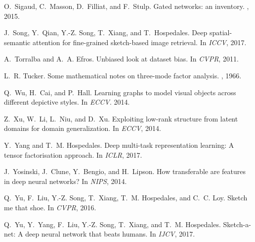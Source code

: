 \documentclass[10pt,twocolumn,letterpaper]{article}
\begin{document}
{\begin{thebibliography}{10}
O.~Sigaud, C.~Masson, D.~Filliat, and F.~Stulp.
\newblock Gated networks: an inventory.
, 2015.

J.~Song, Y.~Qian, Y.-Z. Song, T.~Xiang, and T.~Hospedales.
\newblock Deep spatial-semantic attention for fine-grained sketch-based image
  retrieval.
\newblock In {\em ICCV}, 2017.

A.~Torralba and A.~A. Efros.
\newblock Unbiased look at dataset bias.
\newblock In {\em CVPR}, 2011.

L.~R. Tucker.
\newblock Some mathematical notes on three-mode factor analysis.
, 1966.

Q.~Wu, H.~Cai, and P.~Hall.
\newblock Learning graphs to model visual objects across different depictive
  styles.
\newblock In {\em ECCV}. 2014.

Z.~Xu, W.~Li, L.~Niu, and D.~Xu.
\newblock Exploiting low-rank structure from latent domains for domain
  generalization.
\newblock In {\em ECCV}, 2014.

Y.~Yang and T.~M. Hospedales.
\newblock Deep multi-task representation learning: A tensor factorisation
  approach.
\newblock In {\em ICLR}, 2017.

J.~Yosinski, J.~Clune, Y.~Bengio, and H.~Lipson.
\newblock How transferable are features in deep neural networks?
\newblock In {\em NIPS}, 2014.

Q.~Yu, F.~Liu, Y.-Z. Song, T.~Xiang, T.~M. Hospedales, and C.~C. Loy.
\newblock Sketch me that shoe.
\newblock In {\em CVPR}, 2016.

Q.~Yu, Y.~Yang, F.~Liu, Y.-Z. Song, T.~Xiang, and T.~M. Hospedales.
\newblock Sketch-a-net: A deep neural network that beats humans.
\newblock In {\em IJCV}, 2017.

\end{thebibliography}
}
\end{document}
